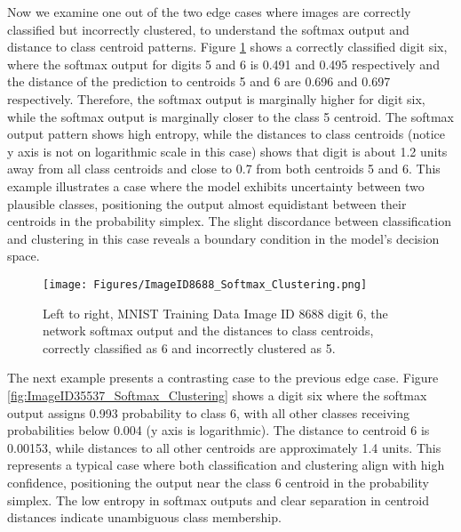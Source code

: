 \indent Now we examine one out of the two edge cases where images are correctly classified but incorrectly clustered, to understand the softmax output and distance to class centroid patterns. Figure \ref{fig:ImageID8688_Softmax_Clustering} shows a correctly classified digit six, where the softmax output for digits 5 and 6 is 0.491 and 0.495 respectively and the distance of the prediction to centroids 5 and 6 are 0.696 and 0.697 respectively. Therefore, the softmax output is marginally higher for digit six, while the softmax output is marginally closer to the class 5 centroid. The softmax output pattern shows high entropy, while the distances to class centroids (notice y axis is not on logarithmic scale in this case) shows that digit is about 1.2 units away from all class centroids and close to 0.7 from both centroids 5 and 6. This example illustrates a case where the model exhibits uncertainty between two plausible classes, positioning the output almost equidistant between their centroids in the probability simplex. The slight discordance between classification and clustering in this case reveals a boundary condition in the model's decision space.


\begin{figure}[ht]
    \centering
    \texttt{[image: Figures/ImageID8688\_Softmax\_Clustering.png]}
    \caption{Left to right, MNIST Training Data Image ID 8688 digit 6, the network softmax output and the distances to class centroids, correctly classified as 6 and incorrectly clustered as 5.     %
    }
\label{fig:ImageID8688_Softmax_Clustering}
\end{figure}

\indent The next example presents a contrasting case to the previous edge case. Figure \ref{fig:ImageID35537_Softmax_Clustering} shows a digit six where the softmax output assigns 0.993 probability to class 6, with all other classes receiving probabilities below 0.004 (y axis is logarithmic). The distance to centroid 6 is 0.00153, while distances to all other centroids are approximately 1.4 units. This represents a typical case where both classification and clustering align with high confidence, positioning the output near the class 6 centroid in the probability simplex. The low entropy in softmax outputs and clear separation in centroid distances indicate unambiguous class membership.

